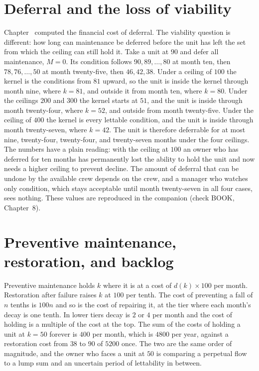 \section{Deferral and the loss of viability}

Chapter~ computed the financial cost of deferral. The viability question is different: how long can maintenance be deferred before the unit has left the set from which the ceiling can still hold it. Take a unit at $90$ and defer all maintenance, $M=0$. Its condition follows $90,89,\dots,80$ at month ten, then $78,76,\dots,50$ at month twenty-five, then $46,42,38$. Under a ceiling of $100$ the kernel is the conditions from $81$ upward, so the unit is inside the kernel through month nine, where $k=81$, and outside it from month ten, where $k=80$. Under the ceilings $200$ and $300$ the kernel starts at $51$, and the unit is inside through month twenty-four, where $k=52$, and outside from month twenty-five. Under the ceiling of $400$ the kernel is every lettable condition, and the unit is inside through month twenty-seven, where $k=42$. The unit is therefore deferrable for at most nine, twenty-four, twenty-four, and twenty-seven months under the four ceilings. The numbers have a plain reading: with the ceiling at $100$ an owner who has deferred for ten months has permanently lost the ability to hold the unit and now needs a higher ceiling to prevent decline. The amount of deferral that can be undone by the available crew depends on the crew, and a manager who watches only condition, which stays acceptable until month twenty-seven in all four cases, sees nothing. These values are reproduced in the companion (check BOOK, Chapter~8).

\section{Preventive maintenance, restoration, and backlog}

Preventive maintenance holds $k$ where it is at a cost of $d(k)\times 100$ per month. Restoration after failure raises $k$ at $100$ per tenth. The cost of preventing a fall of $n$ tenths is $100n$ and so is the cost of repairing it, at the tier where each month's decay is one tenth. In lower tiers decay is $2$ or $4$ per month and the cost of holding is a multiple of the cost at the top. The sum of the costs of holding a unit at $k=50$ forever is $400$ per month, which is $4800$ per year, against a restoration cost from $38$ to $90$ of $5200$ once. The two are the same order of magnitude, and the owner who faces a unit at $50$ is comparing a perpetual flow to a lump sum and an uncertain period of lettability in between.

